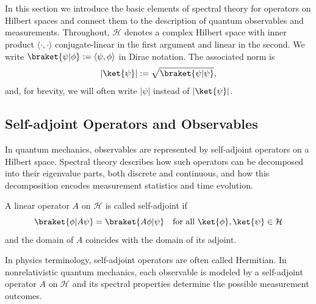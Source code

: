 \section{\filetotitle}\label{sec:spectral_theory_in_hilbert_spaces}
In this section we introduce the basic elements of spectral theory for operators on Hilbert spaces and connect them to the description of quantum observables and measurements. Throughout, $\mathcal{H}$ denotes a complex Hilbert space with inner product $\langle\cdot,\cdot\rangle$ conjugate-linear in the first argument and linear in the second. We write $\braket{\psi|\phi}:=\langle\psi,\phi\rangle$ in Dirac notation. The associated norm is
\begin{equation}
\lvert\ket{\psi}\rvert := \sqrt{\braket{\psi|\psi}},
\end{equation}
and, for brevity, we will often write $\lvert\psi\rvert$ instead of $\lvert\ket{\psi}\rvert$.
\subsection{Self-adjoint Operators and Observables}\label{sec:self_adjoint_operators_and_observables}
In quantum mechanics, observables are represented by self-adjoint operators on a Hilbert space.\cite{1378551877,1423848155} Spectral theory describes how such operators can be decomposed into their eigenvalue parts, both discrete and continuous, and how this decomposition encodes measurement statistics and time evolution.
\begin{definition}
A linear operator $A$ on $\mathcal{H}$ is called self-adjoint if
\begin{equation}
\braket{\phi|A\psi}=\braket{A\phi|\psi}\quad\text{for all }\ket{\phi},\ket{\psi}\in\mathcal{H}
\end{equation}
and the domain of $A$ coincides with the domain of its adjoint.
\end{definition}
In physics terminology, self-adjoint operators are often called Hermitian. In nonrelativistic quantum mechanics, each observable is modeled by a self-adjoint operator $A$ on $\mathcal{H}$ and its spectral properties determine the possible measurement outcomes.

